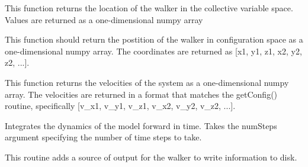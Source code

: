 \documentclass[letterpaper,10pt,english]{sphinxmanual}
\begin{document}
\begin{fulllineitems}

\begin{fulllineitems}
\label{walker_api/walker_api.doc:walker_base.walker.getColvars}
This function returns the location of the walker in the collective variable space. Values are returned as a one-dimensional numpy array

\end{fulllineitems}


\begin{fulllineitems}
\label{walker_api/walker_api.doc:walker_base.walker.getConfig}
This function should return the postition of the walker in configuration space as a one-dimensional numpy array. The coordinates are returned as {[}x1, y1, z1, x2, y2, z2, ...{]}.

\end{fulllineitems}


\begin{fulllineitems}
\label{walker_api/walker_api.doc:walker_base.walker.getVel}
This function returns the velocities of the system as a one-dimensional numpy array. The velocities are returned in a format that matches the getConfig() routine, specifically {[}v\_x1, v\_y1, v\_z1, v\_x2, v\_y2, v\_z2, ...{]}.

\end{fulllineitems}


\begin{fulllineitems}
\label{walker_api/walker_api.doc:walker_base.walker.propagate}
Integrates the dynamics of the model forward in time. Takes the numSteps argument specifying the number of time steps to take.

\end{fulllineitems}


\begin{fulllineitems}
\label{walker_api/walker_api.doc:walker_base.walker.removeOutput}
This routine adds a source of output for the walker to write information to disk.


\end{fulllineitems}
\end{fulllineitems}
\end{document}

